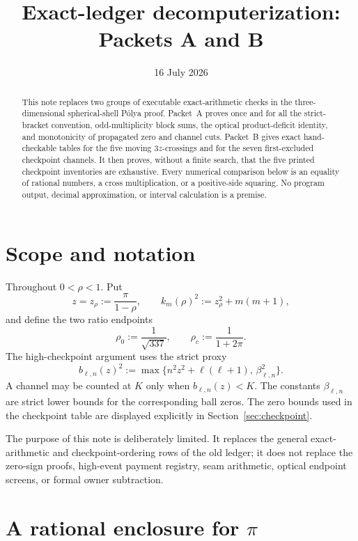 \documentclass[11pt]{article}
\title{Exact-ledger decomputerization:\\Packets A and B}
\author{}
\date{16 July 2026}
\theoremstyle{definition}
\theoremstyle{remark}
\newcommand{\rhoc}{\rho_{c}}
\newcommand{\rhozero}{\rho_{0}}
\begin{document}
\maketitle

\begin{abstract}
This note replaces two groups of executable exact-arithmetic checks in the
three-dimensional spherical-shell P\'olya proof.  Packet~A proves once and
for all the strict-bracket convention, odd-multiplicity block sums, the
optical product-deficit identity, and monotonicity of propagated zero and
channel cuts.  Packet~B gives exact hand-checkable tables for the five
moving \(3z\)-crossings and for the seven first-excluded checkpoint
channels.  It then proves, without a finite search, that the five printed
checkpoint inventories are exhaustive.  Every numerical comparison below
is an equality of rational numbers, a cross multiplication, or a
positive-side squaring.  No program output, decimal approximation, or
interval calculation is a premise.
\end{abstract}

\tableofcontents

\section{Scope and notation}

Throughout \(0<\rho<1\).  Put
\[
 z=z_\rho:=\frac{\pi}{1-\rho},\qquad
 k_m(\rho)^2:=z_\rho^2+m(m+1),
\]
and define the two ratio endpoints
\[
 \rhozero:=\frac1{\sqrt{337}},
 \qquad
 \rhoc:=\frac1{1+2\pi}.
\]
The high-checkpoint argument uses the strict proxy
\begin{equation}
 b_{\ell,n}(z)^2
 :=\max\{n^2z^2+\ell(\ell+1),\,\beta_{\ell,n}^2\}.
 \label{eq:strict-proxy}
\end{equation}
A channel may be counted at \(K\) only when
\(b_{\ell,n}(z)<K\).  The constants \(\beta_{\ell,n}\) are strict lower
bounds for the corresponding ball zeros.  The zero bounds used in the
checkpoint table are displayed explicitly in Section~\ref{sec:checkpoint}.

The purpose of this note is deliberately limited.  It replaces the
general exact-arithmetic and checkpoint-ordering rows of the old ledger; it
does not replace the zero-sign proofs, high-event payment registry, seam
arithmetic, optical endpoint screens, or formal owner subtraction.

\section{A rational enclosure for \texorpdfstring{\(\pi\)}{pi}}
\label{sec:pi}
\end{document}
